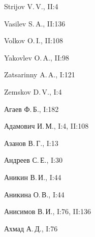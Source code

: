 \begin{theindex}
  \item Strijov V.\,V., II:4





  \indexspace





  \item Vasilev S.\,A., II:136


  \item Volkov O.\,I., II:108





  \indexspace





  \item Yakovlev O.\,A., II:98





  \indexspace





  \item Zatsarinny A.\,A., I:121


  \item Zemskov D.\,V., I:4







\newpage





  \item Агаев Ф.\,Б., I:182


  \item Адамович И.\,М., I:4, II:108


  \item Азанов В.\,Г., I:13


  \item Андреев С.\,Е., I:30


  \item Аникин В.\,И., I:44


  \item Аникина О.\,В., I:44


  \item Анисимов В.\,И., I:76, II:136


  \item Ахмад А.\,Д., I:76





  \indexspace






\end{theindex}

